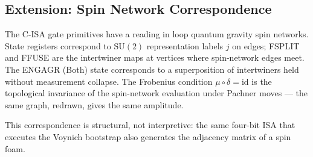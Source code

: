 \documentclass[12pt,a4paper]{article}
\begin{document}
\subsection{Extension: Spin Network Correspondence}

The C-ISA gate primitives have a reading in loop quantum gravity spin
networks. State registers correspond to $\mathrm{SU}(2)$ representation
labels $j$ on edges; FSPLIT and FFUSE are the intertwiner maps at vertices
where spin-network edges meet. The ENGAGR (Both) state corresponds to a
superposition of intertwiners held without measurement collapse. The Frobenius
condition $\mu \circ \delta = \mathrm{id}$ is the topological invariance of
the spin-network evaluation under Pachner moves --- the same graph, redrawn,
gives the same amplitude.

This correspondence is structural, not interpretive: the same four-bit ISA
that executes the Voynich bootstrap also generates the adjacency matrix of a
spin foam.
\end{document}

